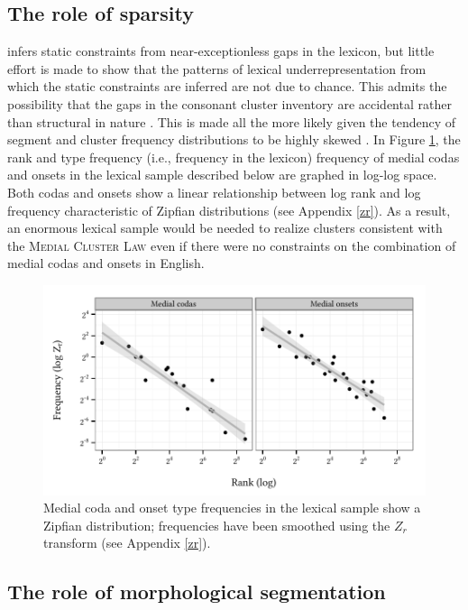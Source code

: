 \subsection{The role of sparsity}

\citet{Pierrehumbert1994} infers static constraints from near-exceptionless gaps in the lexicon, but little effort is made to show that the patterns of lexical underrepresentation from which the static constraints are inferred are not due to chance. This admits the possibility that the gaps in the consonant cluster inventory are accidental rather than structural in nature \citep{Fischer-Jorgensen1952,Vogt1954}. This is made all the more likely given the tendency of segment and cluster frequency distributions to be highly skewed \citep[e.g.,][]{Pande2010,Sigurd1968,Tambovtsev2007,Weiss1961}. In Figure \ref{cao}, the rank and type frequency (i.e., frequency in the lexicon) frequency of medial codas and onsets in the lexical sample described below are graphed in log-log space. Both codas and onsets show a linear relationship between log rank and log frequency characteristic of Zipfian distributions (see Appendix \ref{zr}). As a result, an enormous lexical sample would be needed to realize clusters consistent with the \textsc{Medial Cluster Law} even if there were no constraints on the combination of medial codas and onsets in English.

\begin{figure}
\centering
\includegraphics{co.pdf}
\caption{Medial coda and onset type frequencies in the lexical sample show a Zipfian distribution; frequencies have been smoothed using the $Z_r$ transform (see Appendix \ref{zr}).}
\label{cao}
\end{figure}

\subsection{The role of morphological segmentation}

